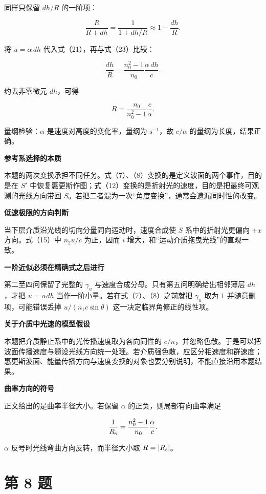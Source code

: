 \documentclass[12pt,a4paper,UTF8]{ctexart}
\begin{document}
同样只保留 \(dh/R\) 的一阶项：

\[
\frac{R}{R+dh}
=\frac1{1+dh/R}
\approx1-\frac{dh}{R}.
\tag{23}
\]

将 \(u=\alpha\,dh\) 代入式（21），再与式（23）比较：

\[
\frac{dh}{R}
=\frac{n_0^2-1}{n_0}\frac{\alpha\,dh}{c}.
\]

约去非零微元 \(dh\)，可得

\[
\boxed{
R=\frac{n_0}{n_0^2-1}\frac{c}{\alpha}
}.
\tag{24}
\]

量纲检验：\(\alpha\) 是速度对高度的变化率，量纲为
\(\mathrm{s^{-1}}\)，故 \(c/\alpha\) 的量纲为长度，结果正确。

\textbf{参考系选择的本质}

本题的两次变换承担不同任务。式（7）、（8）变换的是定义波面的两个事件，目的是在
\(S'\)
中恢复惠更斯作图；式（12）变换的是折射光的速度，目的是把最终可观测的光线方向带回
\(S\)。若把二者混为一次``角度变换''，通常会遗漏同时性的改变。

\textbf{低速极限的方向判断}

当下层介质沿光线的切向分量同向运动时，速度合成使 \(S\)
系中的折射光更偏向 \(+x\) 方向。式（15）中 \(n_2u/c\) 为正，因而 \(i\)
增大，和``运动介质拖曳光线''的直观一致。

\textbf{一阶近似必须在精确式之后进行}

第二至四问保留了完整的 \(\gamma_u\)
与速度合成分母。只有第五问明确给出相邻薄层 \(dh\)，才把 \(u=\alpha dh\)
当作一阶小量。若在式（7）、（8）之前就把 \(\gamma_u\) 取为 \(1\)
并随意删项，可能错误丢掉 \(u/(n_1c\sin\theta)\)
这一决定临界角修正的线性项。

\textbf{关于介质中光速的模型假设}

本题把介质静止系中的光传播速度取为各向同性的
\(c/n\)，并忽略色散。于是可以把波面传播速度与题设光线方向统一处理。若介质强色散，应区分相速度和群速度；惠更斯波面、能量传播方向与速度变换的对象也要分别说明，不能直接沿用本题结果。

\textbf{曲率方向的符号}

正文给出的是曲率半径大小。若保留 \(\alpha\) 的正负，则局部有向曲率满足

\[
\frac1{R_{\rm s}}
=\frac{n_0^2-1}{n_0}\frac{\alpha}{c}.
\]

\(\alpha\) 反号时光线弯曲方向反转，而半径大小取 \(R=|R_{\rm s}|\)。

\newpage

\section{第 8 题}\label{ux7b2c-8-ux9898}
\end{document}
